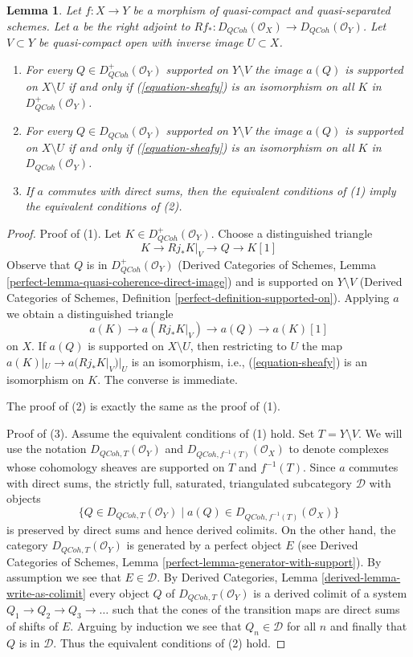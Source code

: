\documentclass[10pt,a4paper]{amsart}
\theoremstyle{plain}
\newtheorem{lemma}[subsection]{Lemma}
\theoremstyle{definition}
\theoremstyle{remark}
\numberwithin{equation}{subsection}
\def\QCoh{\mathit{QCoh}}
\begin{document}
\begin{lemma}
\label{lemma-when-sheafy}
Let $f : X \to Y$ be a morphism of quasi-compact and quasi-separated
schemes. Let $a$ be the right adjoint to
$Rf_* : D_\QCoh(\mathcal{O}_X) \to D_\QCoh(\mathcal{O}_Y)$.
Let $V \subset Y$ be quasi-compact open with inverse image $U \subset X$.
\begin{enumerate}
\item For every $Q \in D_\QCoh^+(\mathcal{O}_Y)$
supported on $Y \setminus V$ the image $a(Q)$ is supported on
$X \setminus U$ if and only if (\ref{equation-sheafy})
is an isomorphism on all $K$ in $D_\QCoh^+(\mathcal{O}_Y)$.
\item For every $Q \in D_\QCoh(\mathcal{O}_Y)$
supported on $Y \setminus V$ the image $a(Q)$ is supported on
$X \setminus U$ if and only if (\ref{equation-sheafy})
is an isomorphism on all $K$ in $D_\QCoh(\mathcal{O}_Y)$.
\item If $a$ commutes with direct sums, then the equivalent conditions of
(1) imply the equivalent conditions of (2).
\end{enumerate}
\end{lemma}

\begin{proof}
Proof of (1). Let $K \in D_\QCoh^+(\mathcal{O}_Y)$.
Choose a distinguished triangle
$$
K \to Rj_*K|_V \to Q \to K[1]
$$
Observe that $Q$ is in $D_\QCoh^+(\mathcal{O}_Y)$
(Derived Categories of Schemes, Lemma
\ref{perfect-lemma-quasi-coherence-direct-image})
and is supported on $Y \setminus V$
(Derived Categories of Schemes, Definition
\ref{perfect-definition-supported-on}).
Applying $a$ we obtain a distinguished triangle
$$
a(K) \to a(Rj_*K|_V) \to a(Q) \to a(K)[1]
$$
on $X$. If $a(Q)$ is supported on $X \setminus U$, then
restricting to $U$ the map $a(K)|_U \to a(Rj_*K|_V)|_U$ is an
isomorphism, i.e., (\ref{equation-sheafy}) is an isomorphism on $K$.
The converse is immediate.

\medskip\noindent
The proof of (2) is exactly the same as the proof of (1).

\medskip\noindent
Proof of (3). Assume the equivalent conditions of (1) hold.
Set $T = Y \setminus V$.
We will use the notation $D_{\QCoh, T}(\mathcal{O}_Y)$ and
$D_{\QCoh, f^{-1}(T)}(\mathcal{O}_X)$ to denote complexes
whose cohomology sheaves are supported on $T$ and $f^{-1}(T)$.
Since $a$ commutes with direct sums, the strictly full, saturated, triangulated
subcategory $\mathcal{D}$ with objects
$$
\{Q \in D_{\QCoh, T}(\mathcal{O}_Y) \mid
a(Q) \in D_{\QCoh, f^{-1}(T)}(\mathcal{O}_X)\}
$$
is preserved by direct sums and hence derived colimits.
On the other hand, the category $D_{\QCoh, T}(\mathcal{O}_Y)$
is generated by a perfect object $E$
(see Derived Categories of Schemes, Lemma
\ref{perfect-lemma-generator-with-support}).
By assumption we see that $E \in \mathcal{D}$.
By Derived Categories, Lemma \ref{derived-lemma-write-as-colimit}
every object $Q$ of $D_{\QCoh, T}(\mathcal{O}_Y)$ is a derived
colimit of a system $Q_1 \to Q_2 \to Q_3 \to \ldots$
such that the cones of the transition maps are direct sums
of shifts of $E$. Arguing by induction we see that
$Q_n \in \mathcal{D}$ for all $n$ and finally that $Q$ is
in $\mathcal{D}$. Thus the equivalent conditions of (2) hold.
\end{proof}
\end{document}
